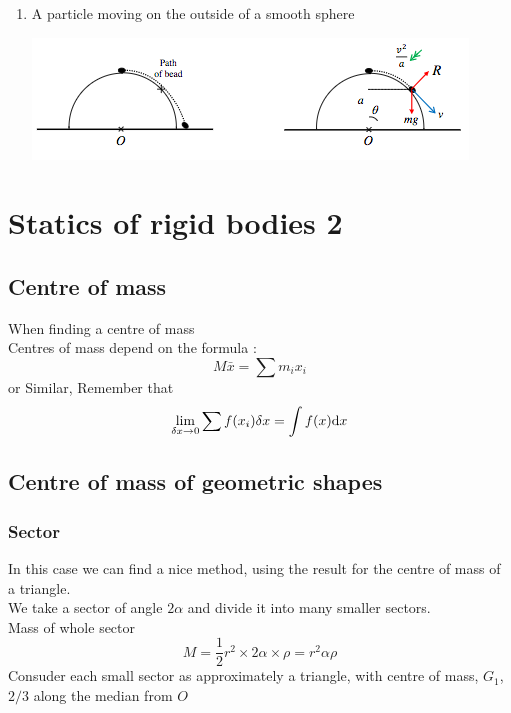 \documentclass[a4paper]{article}
\begin{document}
\begin{enumerate}
\begin{center}
    \end{center}
	\item A particle moving on the outside of a smooth sphere
    \begin{center}
        \includegraphics[scale=0.5]{img_M/13_eg7}
    \end{center}
\end{enumerate}
\section{Statics of rigid bodies 2}
\subsection{Centre of mass}
When finding a centre of mass \\

Centres of mass depend on the formula :
\[
    M\bar{x}=\sum m_ix_i
\]
or Similar, Remember that 
\[
    \lim_{\delta x\rightarrow 0}\sum f(x_i)\delta x=\int f(x) \mathrm{d} x
\]

\subsection{Centre of mass of geometric shapes}
\subsubsection{Sector}
In this case we can find a nice method, using the result for the centre of mass of a triangle.
\\
We take a sector of angle $2\alpha$ and divide it into many smaller sectors.\\

Mass of whole sector 
\[
    M=\frac{1}{2}r^2\times 2\alpha\times\rho=r^2\alpha\rho
\]
Consuder each small sector as approximately a triangle, with centre of mass, $G_1$, $2/3$ along the median from $O$\\
\end{document}
